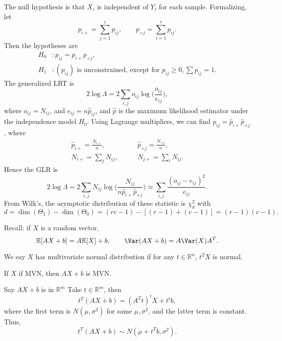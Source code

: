 \documentclass[12pt]{article}
\begin{document}
The null hypothesis is that $X_i$ is independent of $Y_i$ for each sample. Formalizing, let
\[
p_{i+} = \sum_{j = 1}^{c} p_{ij}, \qquad p_{+j} = \sum_{i = 1}^{r} p_{ij}.
\]
Then the hypotheses are
\begin{align*}
	H_0 &: p_{ij} = p_{i+}p_{+j}, \\
	H_1 &: (p_{ij}) \text{ is unconstrained, except for } p_{ij} \geq 0, \sum p_{ij} = 1.
\end{align*}
The generalized LRT is
\[
2 \log \Lambda = 2 \sum_{i,j} o_{ij} \log \biggl( \frac{o_{ij}}{e_{ij}}\biggr),
\]
where $o_{ij} = N_{ij}$, and $e_{ij} = n \hat p_{ij}$, and $\hat p$ is the maximum likelihood estimator under the independence model $H_0$. Using Lagrange multipliers, we can find $\hat p_{ij} = \hat p_{i+} \hat p_{+j}$, where
\begin{align*}
	\hat p_{i+} = \frac{N_{i+}}{n}, \qquad &\hat p_{+j} = \frac{N_{+j}}{n}, \\
	N_{i+} = \sum_{j} N_{ij}, \qquad &N_{j+} = \sum_{i} N_{ij}.
\end{align*}
Hence the GLR is
\[
2 \log \Lambda = 2 \sum_{i, j} N_{ij} \log \biggl( \frac{N_{ij}}{n \hat p_{i+}\hat p_{+j}} \biggr) \approx \sum_{i,j} \frac{(o_{ij} - e_{ij})^2}{e_{ij}}.
\]
From Wilk's, the asymptotic distribution of these statistic is $\chi_d^2$ with
\[
	d = \dim (\Theta_1) - \dim(\Theta_0) = (rc - 1) - [(r-1) + (c-1)] = (r-1)(c-1).
\]


Recall: if $X$ is a random vector,
\[
\mathbb{E}[AX + b] = A \mathbb{E}[X] + b, \qquad \Var(AX + b) = A\Var(X)A^{T}.
\]

\begin{definition}
	We say $X$ has multivariate normal distribution if for any $t \in \mathbb{R}^{n}$, $t^{T}X$ is normal.
\end{definition}

\begin{proposition}
	If $X$ if MVN, then $AX + b$ is MVN.
\end{proposition}

\begin{proofbox}
	Say $AX + b$ is in $\mathbb{R}^{m}$ Take $t \in \mathbb{R}^{m}$, then
	\[
	t^{T}(AX + b) = (A^{T}t)^{t}X + t^{t}b,
	\]
	where the first term is $N(\mu, \sigma^2)$ for some $\mu, \sigma^2$, and the latter term is constant. Thus,
	\[
	t^{T}(AX + b) \sim N(\mu + t^{T}b, \sigma^2).
	\]
\end{proofbox}
\end{document}
